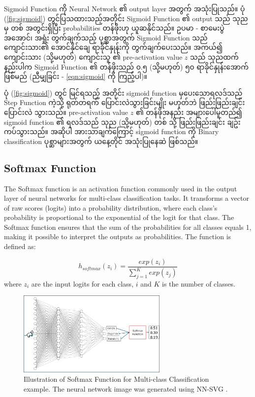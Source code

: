 \vspace{1.5em} 

Sigmoid Function ကို Neural Network ၏ output layer အတွက် အသုံးပြုသည်။ ပုံ (\ref{fig:sigmoid}) တွင်ပြသထားသည့်အတိုင်း Sigmoid Function ၏ output သည် သုညမှ တစ် အတွင်းရှိပြီး probabilities တန်ဖိုးဟု ယူဆနိုင်သည်။ ဥပမာ - စာမေးပွဲ အအောင်၊ အရှုံး တွက်ချက်သည့် ပုစ္ဆာအတွက် Sigmoid Function သည် ကျောင်းသား၏ အောင်နိုင်ချေ ရာခိုင်နှုန်းကို တွက်ချက်ပေးသည်။ အကယ်၍ ကျောင်းသား (သို့မဟုတ်) ကျောင်းသူ ၏ pre-activation value $z$ သည် သုညထက်နည်းပါက Sigmoid Function ၏ တန်ဖိုးသည် ၀.၅ (သို့မဟုတ်) ၅၀ ရာခိုင်နှုန်းအောက် ဖြစ်မည် (ညီမျှခြင်း - \ref{eqn:sigmoid} ကို ကြည့်ပါ)။ 

ပုံ (\ref{fig:sigmoid}) တွင် မြင်ရသည့် အတိုင်း sigmoid function မှပေးသောရလဒ်သည် Step Function ကဲ့သို့ ရုတ်တရက် ပြောင်းလဲသွားခြင်းမျိုး မဟုတ်ဘဲ  ဖြည်းဖြည်းချင်း ပြောင်းလဲ သွားသည်။ pre-activation value $z$ ၏ တန်ဖိုအနည်း အများပေါ်မူတည်၍  sigmoid function ၏ ရလဒ်သည် သုည (သို့မဟုတ်) တစ် သို့ ဖြည်းဖြည်းချင်း ချဥ်းကပ်သွားသည်။ အဆိုပါ အားသာချက်ကြောင့် sigmoid function ကို Binary classification ပုစ္ဆာများအတွက် ယနေ့တိုင် အသုံးပြုနေဆဲ ဖြစ်သည်။ 

\subsection{Softmax Function} 

The Softmax function is an activation function commonly used in the output layer of neural networks for multi-class classification tasks. It transforms a vector of raw scores (logits) into a probability distribution, where each class's probability is proportional to the exponential of the logit for that class. The Softmax function ensures that the sum of the probabilities for all classes equals 1, making it possible to interpret the outputs as probabilities. The function is defined as:

\begin{equation}\label{eqn:softmax}
    h_{softmax}(z_i) = \frac{exp(z_i)}{\sum_{j=1}^{K}exp(z_j)}
\end{equation} where $z_i$ are the input logits for each class, $i$ and $K$ is the number of classes. 

\vspace{0.5em} 

\begin{figure}[h]%
\centering
\includegraphics[width=0.65\textwidth]{imgs/softmax.png}
\caption{Illustration of Softmax Function for Multi-class Classification example. The neural network image was generated using NN-SVG \cite{web:NNSVG}.}\label{fig:softmax}
\end{figure}

